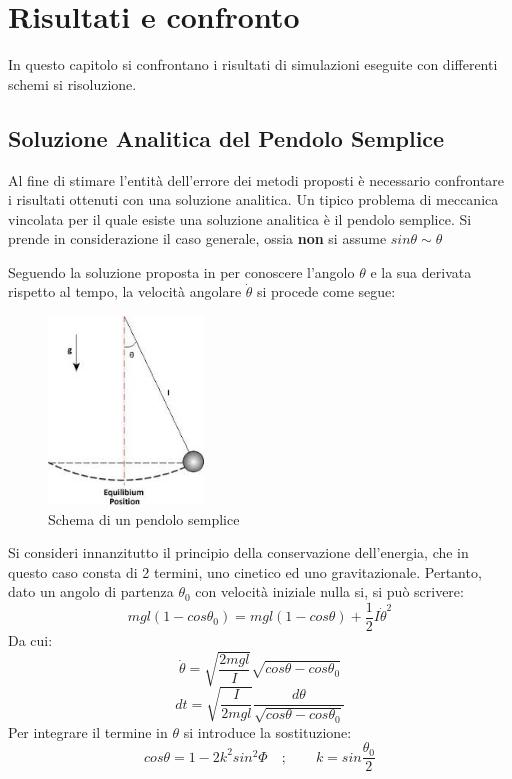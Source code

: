 \chapter{Risultati e confronto}
In questo capitolo si confrontano i risultati di simulazioni eseguite con differenti schemi si risoluzione.
\section{Soluzione Analitica del Pendolo Semplice}
Al fine di stimare l'entità dell'errore dei metodi proposti è necessario confrontare i risultati ottenuti con una soluzione analitica. Un tipico problema di meccanica vincolata per il quale esiste una soluzione analitica è il pendolo semplice. Si prende in considerazione il caso generale, ossia \textbf{non} si assume $sin\theta \sim \theta$

Seguendo la soluzione proposta in \cite{Davis} per conoscere l'angolo $\theta$ e la sua derivata rispetto al tempo, la velocità angolare $\dot{\theta}$ si procede come segue:
\begin{figure}[h!]
\centering
\includegraphics[height=5cm]{Figure/pend.jpg}
\caption{Schema di un pendolo semplice}
 \label{fig:Pend}
\end{figure}
Si consideri innanzitutto il principio della conservazione dell'energia, che in questo caso consta di 2 termini, uno cinetico ed uno gravitazionale. Pertanto, dato un angolo di partenza $\theta_0$ con velocità iniziale nulla si, si può scrivere:
\begin{equation}
    mgl\left(1-cos\theta_0\right) = mgl\left(1-cos\theta \right)+\frac{1}{2}I\dot{\theta}^2
\end{equation}
Da cui:
\begin{equation}
    \dot{\theta} = \sqrt{\frac{2mgl}{I}} \sqrt{cos\theta - cos\theta_0}
\end{equation}
\begin{equation}
    dt =  \sqrt{\frac{I}{2mgl}} \frac{d\theta}{\sqrt{cos\theta - cos\theta_0}} 
\end{equation}
Per integrare il termine in $\theta$ si introduce la sostituzione:
\begin{equation} \label{eq:pend_sub}
    cos\theta = 1-2k^2sin^2\Phi \quad ; \qquad k = sin\frac{\theta_0}{2}
\end{equation}


